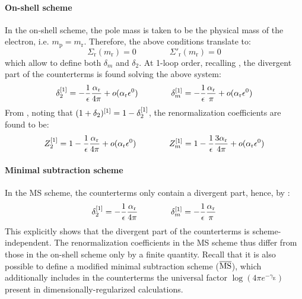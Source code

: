 \paragraph{On-shell scheme}

In the on-shell scheme, the pole mass is taken to be the physical mass of the electron, i.e. $ m_\text{p} = m_\text{r} $. Therefore, the above conditions translate to:
\begin{equation}
  \Sigma_\text{r}(m_\text{r}) = 0
  \qquad \qquad
  \Sigma'_\text{r}(m_\text{r}) = 0
  \label{eq:qed-mass-renorm}
\end{equation}
which allow to define both $ \delta_m $ and $ \delta_2 $. At 1-loop order, recalling , the divergent part of the counterterms is found solving the above system:
\begin{equation}
  \delta_2^{[1]} = - \frac{1}{\epsilon} \frac{\alpha_\text{r}}{4\pi} + o(\alpha_\text{r} \epsilon^0)
  \qquad \qquad
  \delta_m^{[1]} = - \frac{1}{\epsilon} \frac{\alpha_\text{r}}{\pi} + o(\alpha_\text{r} \epsilon^0)
  \label{eq:qed-dz2}
\end{equation}
From , noting that $ (1 + \delta_2)^{[1]} = 1 - \delta_2^{[1]} $, the renormalization coefficients are found to be:
\begin{equation}
  Z_2^{[1]} = 1 - \frac{1}{\epsilon} \frac{\alpha_\text{r}}{4\pi} + o(\alpha_\text{r} \epsilon^0)
  \qquad \qquad
  Z_m^{[1]} = 1 - \frac{1}{\epsilon} \frac{3\alpha_\text{r}}{4\pi} + o(\alpha_\text{r} \epsilon^0)
  \label{eq:qed-z2}
\end{equation}

\paragraph{Minimal subtraction scheme}

In the MS scheme, the counterterms only contain a divergent part, hence, by :
\begin{equation}
  \delta_2^{[1]} = - \frac{1}{\epsilon} \frac{\alpha_\text{r}}{4\pi}
  \qquad \qquad
  \delta_m^{[1]} = - \frac{1}{\epsilon} \frac{\alpha_\text{r}}{\pi}
\end{equation}
This explicitly shows that the divergent part of the counterterms is scheme-independent. The renormalization coefficients in the MS scheme thus differ from those in the on-shell scheme only by a finite quantity.
Recall that it is also possible to define a modified minimal subtraction scheme ($ \overline{\text{MS}} $), which additionally includes in the counterterms the universal factor $ \log (4\pi e^{-\gamma_\text{E}}) $ present in dimensionally-regularized calculations.

